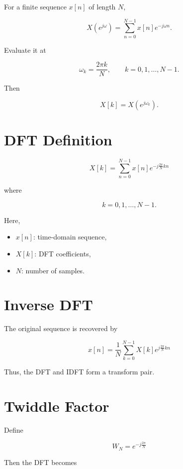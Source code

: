 For a finite sequence \(x[n]\) of length \(N\),

\[
X(e^{j\omega})=
\sum_{n=0}^{N-1}x[n]e^{-j\omega n}.
\]

Evaluate it at

\[
\omega_k=\frac{2\pi k}{N},
\qquad k=0,1,\ldots,N-1.
\]

Then

\[
X[k]=X(e^{j\omega_k}).
\]


\section{DFT Definition}

\[
\boxed{
X[k]=
\sum_{n=0}^{N-1}
x[n]e^{-j\frac{2\pi}{N}kn}
}
\]

where

\[
k=0,1,\ldots,N-1.
\]

Here,

\begin{itemize}
\item \(x[n]\): time-domain sequence,
\item \(X[k]\): DFT coefficients,
\item \(N\): number of samples.
\end{itemize}


\section{Inverse DFT}

The original sequence is recovered by

\[
\boxed{
x[n]=
\frac{1}{N}
\sum_{k=0}^{N-1}
X[k]e^{j\frac{2\pi}{N}kn}
}
\]

Thus, the DFT and IDFT form a transform pair.


\section{Twiddle Factor}

Define

\[
\boxed{
W_N=e^{-j\frac{2\pi}{N}}
}
\]

Then the DFT becomes

